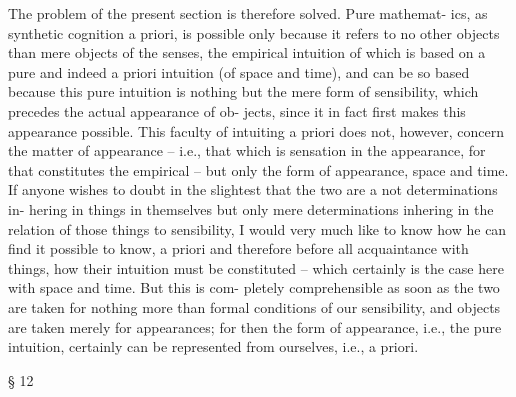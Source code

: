 The problem of the present section is therefore solved. Pure mathemat-
ics, as synthetic cognition a priori, is possible only because it refers to
no other objects than mere objects of the senses, the empirical intuition
of which is based on a pure and indeed a priori intuition (of space and
time), and can be so based because this pure intuition is nothing but the
mere form of sensibility, which precedes the actual appearance of ob-
jects, since it in fact ﬁrst makes this appearance possible. This faculty of
intuiting a priori does not, however, concern the matter of appearance –
i.e., that which is sensation in the appearance, for that constitutes the
empirical – but only the form of appearance, space and time. If anyone
wishes to doubt in the slightest that the two are a not determinations in-
hering in things in themselves but only mere determinations inhering
in the relation of those things to sensibility, I would very much like to
know how he can ﬁnd it possible to know, a priori and therefore before
all acquaintance with things, how their intuition must be constituted –
which certainly is the case here with space and time. But this is com-
pletely comprehensible as soon as the two are taken for nothing more
than formal conditions of our sensibility, and objects are taken merely
for appearances; for then the form of appearance, i.e., the pure intuition,
certainly can be represented from ourselves, i.e., a priori.

§ 12

